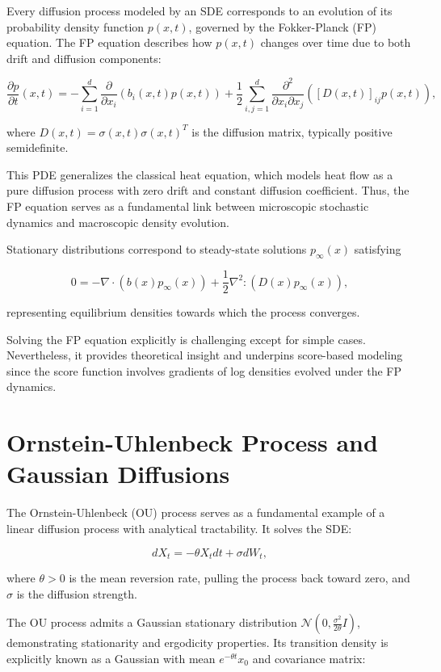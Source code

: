\documentclass[a4paper,12pt,oneside]{memoir}
\begin{document}
Every diffusion process modeled by an SDE corresponds to an evolution of its probability density function \( p(x,t) \), governed by the Fokker-Planck (FP) equation. The FP equation describes how \( p(x,t) \) changes over time due to both drift and diffusion components:

\[
\frac{\partial p}{\partial t}(x,t) = - \sum_{i=1}^d \frac{\partial}{\partial x_i} \left( b_i(x,t) p(x,t) \right) + \frac{1}{2} \sum_{i,j=1}^d \frac{\partial^2}{\partial x_i \partial x_j} \left( [D(x,t)]_{ij} p(x,t) \right),
\]

where \( D(x,t) = \sigma(x,t) \sigma(x,t)^T \) is the diffusion matrix, typically positive semidefinite.

This PDE generalizes the classical heat equation, which models heat flow as a pure diffusion process with zero drift and constant diffusion coefficient. Thus, the FP equation serves as a fundamental link between microscopic stochastic dynamics and macroscopic density evolution.

Stationary distributions correspond to steady-state solutions \( p_\infty(x) \) satisfying

\[
0 = -\nabla \cdot (b(x) p_\infty(x)) + \frac{1}{2} \nabla^2 : (D(x) p_\infty(x)),
\]

representing equilibrium densities towards which the process converges.

Solving the FP equation explicitly is challenging except for simple cases. Nevertheless, it provides theoretical insight and underpins score-based modeling since the score function involves gradients of log densities evolved under the FP dynamics.

\section{Ornstein-Uhlenbeck Process and Gaussian Diffusions}

The Ornstein-Uhlenbeck (OU) process serves as a fundamental example of a linear diffusion process with analytical tractability. It solves the SDE:

\[
dX_t = -\theta X_t dt + \sigma dW_t,
\]

where \( \theta > 0 \) is the mean reversion rate, pulling the process back toward zero, and \( \sigma \) is the diffusion strength.

The OU process admits a Gaussian stationary distribution \( \mathcal{N}(0, \frac{\sigma^2}{2\theta} I) \), demonstrating stationarity and ergodicity properties. Its transition density is explicitly known as a Gaussian with mean \( e^{-\theta t} x_0 \) and covariance matrix:
\end{document}
